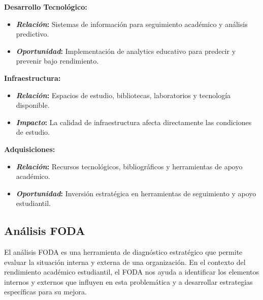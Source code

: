 \documentclass[12pt,letterpaper]{report}
\begin{document}
\textbf{Desarrollo Tecnológico:}
\begin{itemize}
    \item \textbf{\textit{Relación}:} Sistemas de información para seguimiento académico y análisis predictivo.
    \item \textbf{\textit{Oportunidad}:} Implementación de analytics educativo para predecir y prevenir bajo rendimiento.
\end{itemize}

\textbf{Infraestructura:}
\begin{itemize}
    \item \textbf{\textit{Relación}:} Espacios de estudio, bibliotecas, laboratorios y tecnología disponible.
    \item \textbf{\textit{Impacto}:} La calidad de infraestructura afecta directamente las condiciones de estudio.
\end{itemize}

\textbf{Adquisiciones:}
\begin{itemize}
    \item \textbf{\textit{Relación}:} Recursos tecnológicos, bibliográficos y herramientas de apoyo académico.
    \item \textbf{\textit{Oportunidad}:} Inversión estratégica en herramientas de seguimiento y apoyo estudiantil.
\end{itemize}

\subsection{Análisis FODA}

El análisis FODA es una herramienta de diagnóstico estratégico que permite evaluar la situación interna y externa de una organización. En el contexto del rendimiento académico estudiantil, el FODA nos ayuda a identificar los elementos internos y externos que influyen en esta problemática y a desarrollar estrategias específicas para su mejora.
\end{document}
